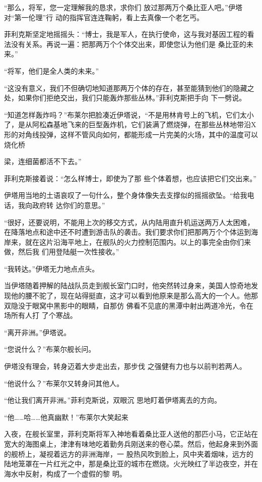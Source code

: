 \documentclass{article}
\begin{document}
“那么，将军，您一定理解我的恳求，求你们
\newpage
放过那两万个桑比亚人吧。”伊塔对“第一伦理”行
动的指挥官连连鞠躬，看上去真像一个老乞丐。 

菲利克斯坚定地摇摇头：“博士，我是军人，在执行使命，这与我对基因工程的看法没有关系。再说一遍：把那两万个个体交出来，即使您认为他们是
桑比亚的未来。” 


“将军，他们是全人类的未来。” 

“这没有意义，我们不但确切地知道那两万个体的存在，甚至能猜到他们的隐藏之处，如果你们拒绝交出，我们只能轰炸那些丛林。”菲利克斯把手向
下一劈说。 

“知道怎样轰炸吗？”布莱尔把脸凑近伊塔说，“不是用林肯号上的飞机，它们太小了，是从阿松森基地飞来的巨型轰炸机，它们装满了燃烧弹，在那些丛林地带沿X形的对角线投弹，这样不管风向如何，都能形成一片完美的火场，其中的温度可以烧化桥

\newpage
梁，连细菌都活不下去。” 

菲利克斯接着说：“怎么样博士，即使为了那
些个体着想，也应该把它们交出来。” 

伊塔用当地的土语哀叹了一句什么，整个身体像失去支撑似的摇摇欲坠。“给我电话，我向政府转
达你们的意思。” 

“很好，还要说明，不能用上次的移交方式，从内陆用直升机运送两万人太困难，在降落地点和途中还不时遭到游击队的袭击。我们要求你们把那两万个个体运到海岸来，就在这片沿海平地上，在舰队的火力控制范围内。以上的事完全由你们来做，然后我
们用登陆艇一次性接收。” 


“我转达。”伊塔无力地点点头。 

当伊塔随着押解的陆战队员走到舰长室门口时，他突然转过身来，美国人惊奇地发现他的腰不驼了，现在站得挺直，这才可以看到他原来是那么高大的一个人。他那双隐没于眼窝中黑影中的眼睛，自那仿
\newpage
佛看不见底的黑潭中射出两道冷光，令在场所有人打
了个寒战。 


“离开非洲。”伊塔说。 


“您说什么？”布莱尔舰长问。 

伊塔没有理会，转身迈着大步走出去，那步伐
之强健有力也与以前判若两人。 


“他说什么？”布莱尔又转身问其他人。 

“他让我们离开非洲。”菲利克斯说，双眼沉
思地盯着伊塔离去的方向。 

“他……哈……他真幽默！”布莱尔大笑起来

入夜，在舰长室里，菲利克斯将军入神地看着桑比亚人送他的那匹小马，它正站在宽大的海图桌上，津津有味地吃着勤务兵刚送来的卷心菜。然后，他起身来到外面的舰桥上，凝视着远方的非洲海岸，一
\newpage
股热风吹到脸上，风中夹着烟味，远方的陆地笼罩在一片红光之中，那是桑比亚的城市在燃烧。火光映红了半边夜空，并在海水中反射，构成了一个虚假的黎
明。 
\end{document}
